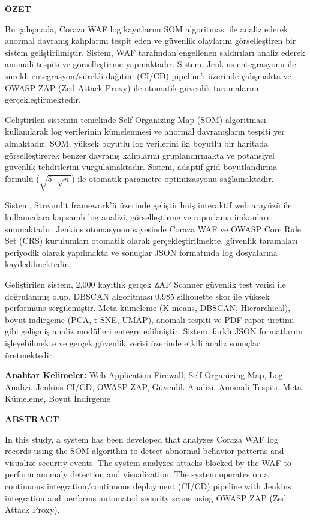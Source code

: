 \newpage
\begin{center}
\large \textbf{ÖZET}
\end{center}

Bu çalışmada, Coraza WAF log kayıtlarını SOM algoritması ile analiz ederek anormal davranış kalıplarını tespit eden ve güvenlik olaylarını görselleştiren bir sistem geliştirilmiştir. Sistem, WAF tarafından engellenen saldırıları analiz ederek anomali tespiti ve görselleştirme yapmaktadır. Sistem, Jenkins entegrasyonu ile sürekli entegrasyon/sürekli dağıtım (CI/CD) pipeline'ı üzerinde çalışmakta ve OWASP ZAP (Zed Attack Proxy) ile otomatik güvenlik taramalarını gerçekleştirmektedir.

Geliştirilen sistemin temelinde Self-Organizing Map (SOM) algoritması kullanılarak log verilerinin kümelenmesi ve anormal davranışların tespiti yer almaktadır. SOM, yüksek boyutlu log verilerini iki boyutlu bir haritada görselleştirerek benzer davranış kalıplarını gruplandırmakta ve potansiyel güvenlik tehditlerini vurgulamaktadır. Sistem, adaptif grid boyutlandırma formülü ($\sqrt{5 \cdot \sqrt{n}}$) ile otomatik parametre optimizasyonu sağlamaktadır.

Sistem, Streamlit framework'ü üzerinde geliştirilmiş interaktif web arayüzü ile kullanıcılara kapsamlı log analizi, görselleştirme ve raporlama imkanları sunmaktadır. Jenkins otomasyonu sayesinde Coraza WAF ve OWASP Core Rule Set (CRS) kurulumları otomatik olarak gerçekleştirilmekte, güvenlik taramaları periyodik olarak yapılmakta ve sonuçlar JSON formatında log dosyalarına kaydedilmektedir.

Geliştirilen sistem, 2,000 kayıtlık gerçek ZAP Scanner güvenlik test verisi ile doğrulanmış olup, DBSCAN algoritması 0.985 silhouette skor ile yüksek performans sergilemiştir. Meta-kümeleme (K-means, DBSCAN, Hierarchical), boyut indirgeme (PCA, t-SNE, UMAP), anomali tespiti ve PDF rapor üretimi gibi gelişmiş analiz modülleri entegre edilmiştir. Sistem, farklı JSON formatlarını işleyebilmekte ve gerçek güvenlik verisi üzerinde etkili analiz sonuçları üretmektedir.

\textbf{Anahtar Kelimeler:} Web Application Firewall, Self-Organizing Map, Log Analizi, Jenkins CI/CD, OWASP ZAP, Güvenlik Analizi, Anomali Tespiti, Meta-Kümeleme, Boyut İndirgeme

\newpage
\begin{center}
\large \textbf{ABSTRACT}
\end{center}

In this study, a system has been developed that analyzes Coraza WAF log records using the SOM algorithm to detect abnormal behavior patterns and visualize security events. The system analyzes attacks blocked by the WAF to perform anomaly detection and visualization. The system operates on a continuous integration/continuous deployment (CI/CD) pipeline with Jenkins integration and performs automated security scans using OWASP ZAP (Zed Attack Proxy).


